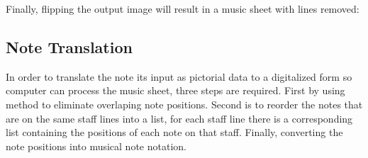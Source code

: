 \documentclass[a4paper,12pt]{report}
\begin{document}
\clearpage
Finally, flipping the output image will result in a music sheet with lines
removed:
\begin{center}
\end{center}

\clearpage

\subsection{Note Translation}
In order to translate the note its input as pictorial data to a digitalized form so 
computer can process the music sheet, three steps are required. First by using 
\textcite{Rosebrock} method to eliminate overlaping note positions. Second is to
reorder the notes that are on the same staff lines into a list, for each staff line
there is a corresponding list containing the positions of each note on that staff.
Finally, converting the note positions into musical note notation.
\end{document}
